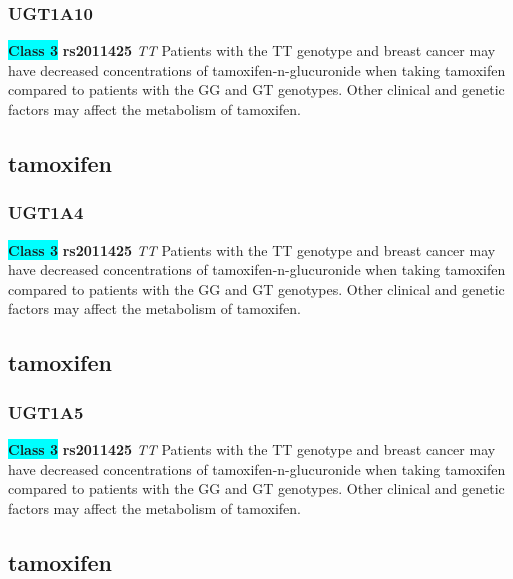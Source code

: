\documentclass{book}
\begin{document}
\subsubsection{ UGT1A10 }

\begin{center}
\textbf{\colorbox{cyan} {Class 3}} \textbf{ rs2011425 } \textit{ TT }
Patients with the TT genotype and breast cancer may have decreased concentrations of tamoxifen-n-glucuronide when taking tamoxifen compared to patients with the GG and GT genotypes. Other clinical and genetic factors may affect the metabolism of tamoxifen.


\end{center}\subsection{ tamoxifen }


\subsubsection{ UGT1A4 }

\begin{center}
\textbf{\colorbox{cyan} {Class 3}} \textbf{ rs2011425 } \textit{ TT }
Patients with the TT genotype and breast cancer may have decreased concentrations of tamoxifen-n-glucuronide when taking tamoxifen compared to patients with the GG and GT genotypes. Other clinical and genetic factors may affect the metabolism of tamoxifen.


\end{center}\subsection{ tamoxifen }


\subsubsection{ UGT1A5 }

\begin{center}
\textbf{\colorbox{cyan} {Class 3}} \textbf{ rs2011425 } \textit{ TT }
Patients with the TT genotype and breast cancer may have decreased concentrations of tamoxifen-n-glucuronide when taking tamoxifen compared to patients with the GG and GT genotypes. Other clinical and genetic factors may affect the metabolism of tamoxifen.


\end{center}\subsection{ tamoxifen }
\end{document}
